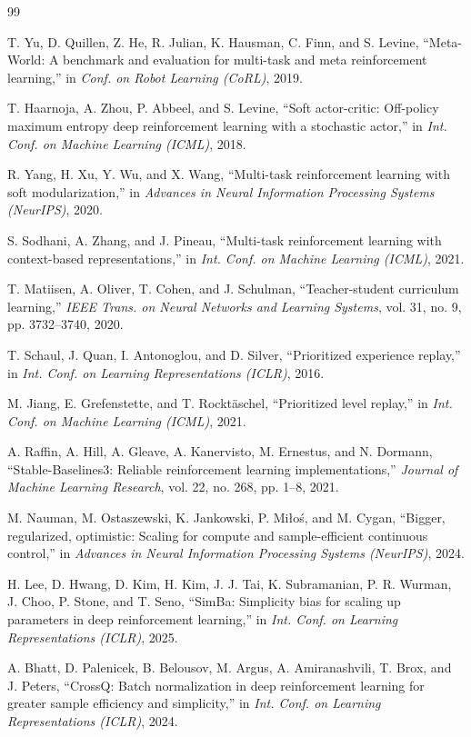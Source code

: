 \documentclass[letterpaper, 10 pt, conference]{ieeeconf}
\begin{document}
\begin{thebibliography}{99}

 T. Yu, D. Quillen, Z. He, R. Julian, K. Hausman, C. Finn, and
S. Levine, ``Meta-World: A benchmark and evaluation for multi-task and meta reinforcement
learning,'' in \emph{Conf. on Robot Learning (CoRL)}, 2019.

 T. Haarnoja, A. Zhou, P. Abbeel, and S. Levine, ``Soft
actor-critic: Off-policy maximum entropy deep reinforcement learning with a stochastic
actor,'' in \emph{Int. Conf. on Machine Learning (ICML)}, 2018.

 R. Yang, H. Xu, Y. Wu, and X. Wang, ``Multi-task reinforcement
learning with soft modularization,'' in \emph{Advances in Neural Information Processing
Systems (NeurIPS)}, 2020.

 S. Sodhani, A. Zhang, and J. Pineau, ``Multi-task reinforcement
learning with context-based representations,'' in \emph{Int. Conf. on Machine Learning
(ICML)}, 2021.

 T. Matiisen, A. Oliver, T. Cohen, and J. Schulman,
``Teacher-student curriculum learning,'' \emph{IEEE Trans. on Neural Networks and Learning
Systems}, vol. 31, no. 9, pp. 3732--3740, 2020.

 T. Schaul, J. Quan, I. Antonoglou, and D. Silver, ``Prioritized
experience replay,'' in \emph{Int. Conf. on Learning Representations (ICLR)}, 2016.

 M. Jiang, E. Grefenstette, and T. Rockt\"{a}schel, ``Prioritized level
replay,'' in \emph{Int. Conf. on Machine Learning (ICML)}, 2021.

 A. Raffin, A. Hill, A. Gleave, A. Kanervisto, M. Ernestus, and
N. Dormann, ``Stable-Baselines3: Reliable reinforcement learning implementations,''
\emph{Journal of Machine Learning Research}, vol. 22, no. 268, pp. 1--8, 2021.

 M. Nauman, M. Ostaszewski, K. Jankowski, P. Mi{\l}o{\'s}, and
M. Cygan, ``Bigger, regularized, optimistic: Scaling for compute and sample-efficient
continuous control,'' in \emph{Advances in Neural Information Processing Systems (NeurIPS)},
2024.

 H. Lee, D. Hwang, D. Kim, H. Kim, J. J. Tai, K. Subramanian,
P. R. Wurman, J. Choo, P. Stone, and T. Seno, ``SimBa: Simplicity bias for scaling up
parameters in deep reinforcement learning,'' in \emph{Int. Conf. on Learning Representations
(ICLR)}, 2025.

 A. Bhatt, D. Palenicek, B. Belousov, M. Argus, A. Amiranashvili,
T. Brox, and J. Peters, ``CrossQ: Batch normalization in deep reinforcement learning for
greater sample efficiency and simplicity,'' in \emph{Int. Conf. on Learning Representations
(ICLR)}, 2024.

\end{thebibliography}
\end{document}
